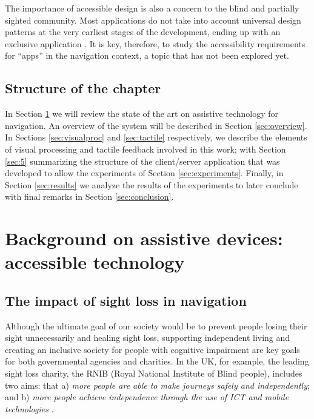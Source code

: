 The importance of accessible design is also a concern to the blind and partially sighted community. Most applications do not take into account universal design patterns at the very earliest stages of the development, ending up with an exclusive application \citep{AndroidHackathon}. It is key, therefore, to study the accessibility requirements for ``apps'' in the navigation context, a topic that has not been explored yet.


\subsection{Structure of the chapter}

In Section \ref{sec:2} we will review the state of the art on assistive technology for navigation. An overview of the system will be described in Section \ref{sec:overview}. In Sections \ref{sec:visualproc} and \ref{sec:tactile} respectively, we describe the elements of visual processing and tactile feedback involved in this work; with Section \ref{sec:5} summarizing the structure of the client/server application that was developed to allow the experiments of Section \ref{sec:experiments}. Finally, in Section \ref{sec:results} we analyze the results of the experiments to later conclude with final remarks in Section \ref{sec:conclusion}.

\section{Background on assistive devices: accessible technology}
\label{sec:2}

\subsection{The impact of sight loss in navigation}

Although the ultimate goal of our society would be to prevent people losing their sight unnecessarily and healing sight loss, supporting independent living and creating an inclusive society for people with cognitive impairment are key goals for both governmental agencies and charities. In the UK, for example, the leading sight loss charity, the RNIB (Royal National Institute of Blind people), includes two aims: that a) \textit{more people are able to make journeys safely and independently}; and b) \textit{more people achieve independence through the use of ICT and mobile technologies} \citep{RNIB2009}.

